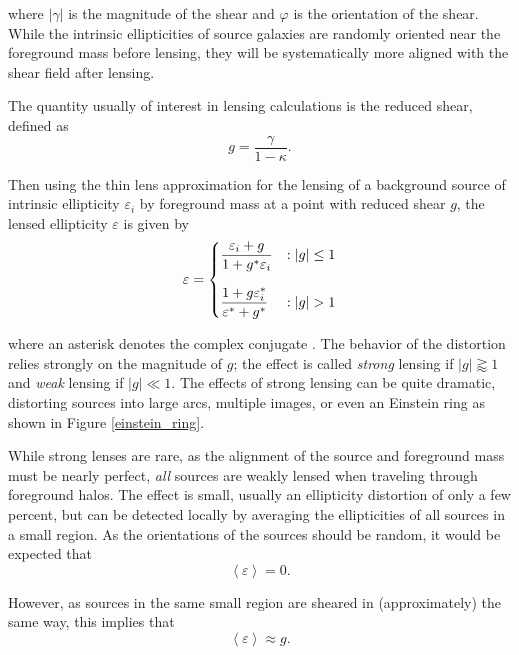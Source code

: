 \documentclass[%
 reprint,
 amsmath,amssymb,
 aps,nofootinbib
]{revtex4-1}
\begin{document}
\noindent where $|\gamma|$ is the magnitude of the shear and $\varphi$ is the orientation of the shear. While the intrinsic ellipticities of source galaxies are randomly oriented near the foreground mass before lensing, they will be systematically more aligned with the shear field after lensing.

The quantity usually of interest in lensing calculations is the reduced shear, defined as
\begin{equation}\label{reduced_shear}
g=\frac{\gamma}{1-\kappa}.
\end{equation}

\noindent Then using the thin lens approximation for the lensing of a background source of intrinsic ellipticity $\varepsilon_i$ by foreground mass at a point with reduced shear $g$, the lensed ellipticity $\varepsilon$ is given by
\begin{equation}\label{lensing}
 \varepsilon = \begin{dcases}
      \frac{\varepsilon_i+g}{1+g^*\varepsilon_i} & : |g|\leq1 \\[0.75em]
       \frac{1+g\varepsilon_i^*}{\varepsilon^*+g^*} & : |g|>1
   \end{dcases}
\end{equation}

\noindent where an asterisk denotes the complex conjugate \cite{schneider}. The behavior of the distortion relies strongly on the magnitude of $g$; the
effect is called \textit{strong} lensing if $|g|\gtrapprox1$ and \textit{weak} lensing if $|g|\ll1$. The effects of strong lensing can be quite dramatic, distorting sources into large arcs, multiple images, or even an Einstein ring as shown in Figure \ref{einstein_ring}.

While strong lenses are rare, as the alignment of the source and foreground mass must be nearly perfect, \textit{all} sources are weakly lensed when traveling through foreground halos. The effect is small, usually an ellipticity distortion of only a few percent, but can be detected locally by averaging the ellipticities of all sources in a small region. As the orientations of the sources should be random, it would be expected that
$$\left<\varepsilon\right>=0.$$

\noindent However, as sources in the same small region are sheared in (approximately) the same way, this implies that
\begin{equation}
\left<\varepsilon\right>\approx g.
\end{equation}
\end{document}
